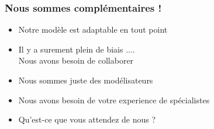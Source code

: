 \documentclass[a4paper]{cours-bdd}
\begin{document}

\begin{frame}[fragile]
  \frametitle{Nous sommes complémentaires !}

  \begin{itemize}
  \item Notre modèle est adaptable en tout point
  \item Il y a surement plein de biais .... \\ Nous avons besoin de
    collaborer
  \end{itemize}

  \bigskip

  
  \begin{itemize}
    \item Nous sommes juste des modélisateurs
    \item Nous avons besoin de votre experience de spécialistes
    \item Qu'est-ce que vous attendez de nous ?
    \end{itemize}

  
\end{frame}
\end{document}
